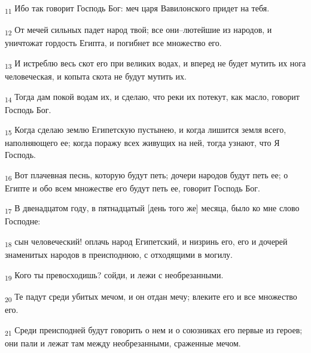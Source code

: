 \begin{tcolorbox}
\textsubscript{11} Ибо так говорит Господь Бог: меч царя Вавилонского придет на тебя.
\end{tcolorbox}
\begin{tcolorbox}
\textsubscript{12} От мечей сильных падет народ твой; все они--лютейшие из народов, и уничтожат гордость Египта, и погибнет все множество его.
\end{tcolorbox}
\begin{tcolorbox}
\textsubscript{13} И истреблю весь скот его при великих водах, и вперед не будет мутить их нога человеческая, и копыта скота не будут мутить их.
\end{tcolorbox}
\begin{tcolorbox}
\textsubscript{14} Тогда дам покой водам их, и сделаю, что реки их потекут, как масло, говорит Господь Бог.
\end{tcolorbox}
\begin{tcolorbox}
\textsubscript{15} Когда сделаю землю Египетскую пустынею, и когда лишится земля всего, наполняющего ее; когда поражу всех живущих на ней, тогда узнают, что Я Господь.
\end{tcolorbox}
\begin{tcolorbox}
\textsubscript{16} Вот плачевная песнь, которую будут петь; дочери народов будут петь ее; о Египте и обо всем множестве его будут петь ее, говорит Господь Бог.
\end{tcolorbox}
\begin{tcolorbox}
\textsubscript{17} В двенадцатом году, в пятнадцатый [день того же] месяца, было ко мне слово Господне:
\end{tcolorbox}
\begin{tcolorbox}
\textsubscript{18} сын человеческий! оплачь народ Египетский, и низринь его, его и дочерей знаменитых народов в преисподнюю, с отходящими в могилу.
\end{tcolorbox}
\begin{tcolorbox}
\textsubscript{19} Кого ты превосходишь? сойди, и лежи с необрезанными.
\end{tcolorbox}
\begin{tcolorbox}
\textsubscript{20} Те падут среди убитых мечом, и он отдан мечу; влеките его и все множество его.
\end{tcolorbox}
\begin{tcolorbox}
\textsubscript{21} Среди преисподней будут говорить о нем и о союзниках его первые из героев; они пали и лежат там между необрезанными, сраженные мечом.
\end{tcolorbox}
